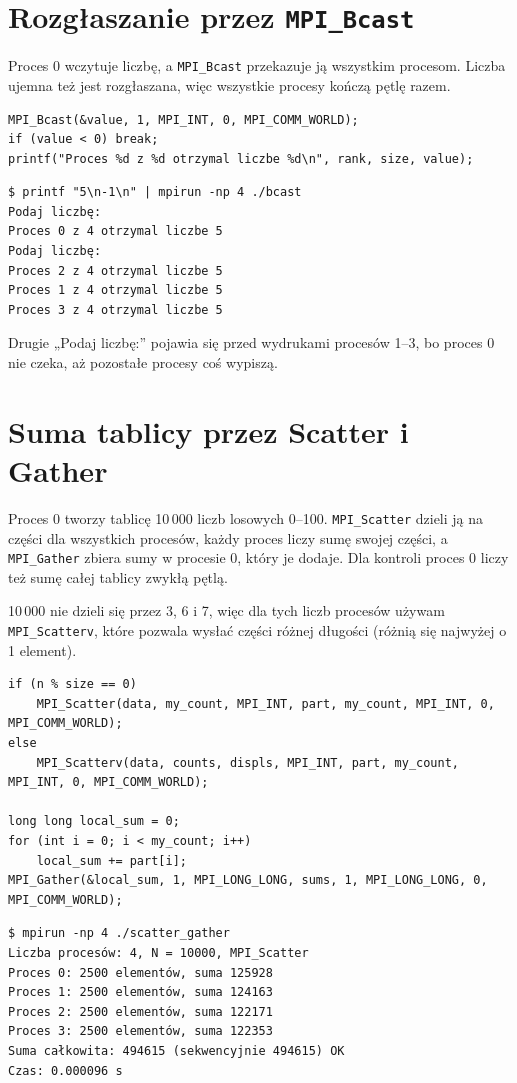 \documentclass[11pt,a4paper]{article}
\begin{document}
\section{Rozgłaszanie przez \texttt{MPI\_Bcast}}
Proces 0 wczytuje liczbę, a \texttt{MPI\_Bcast} przekazuje ją wszystkim procesom. Liczba ujemna też jest rozgłaszana, więc wszystkie procesy kończą pętlę razem.
\begin{lstlisting}
MPI_Bcast(&value, 1, MPI_INT, 0, MPI_COMM_WORLD);
if (value < 0) break;
printf("Proces %d z %d otrzymal liczbe %d\n", rank, size, value);
\end{lstlisting}
\begin{lstlisting}[style=plain]
$ printf "5\n-1\n" | mpirun -np 4 ./bcast
Podaj liczbę:
Proces 0 z 4 otrzymal liczbe 5
Podaj liczbę:
Proces 2 z 4 otrzymal liczbe 5
Proces 1 z 4 otrzymal liczbe 5
Proces 3 z 4 otrzymal liczbe 5
\end{lstlisting}
Drugie „Podaj liczbę:” pojawia się przed wydrukami procesów 1--3, bo proces 0 nie czeka, aż pozostałe procesy coś wypiszą.

\section{Suma tablicy przez Scatter i Gather}
Proces 0 tworzy tablicę 10\,000 liczb losowych 0--100. \texttt{MPI\_Scatter} dzieli ją na części dla wszystkich procesów, każdy proces liczy sumę swojej części, a \texttt{MPI\_Gather} zbiera sumy w procesie 0, który je dodaje. Dla kontroli proces 0 liczy też sumę całej tablicy zwykłą pętlą.

10\,000 nie dzieli się przez 3, 6 i 7, więc dla tych liczb procesów używam \texttt{MPI\_Scatterv}, które pozwala wysłać części różnej długości (różnią się najwyżej o 1 element).
\begin{lstlisting}
if (n % size == 0)
    MPI_Scatter(data, my_count, MPI_INT, part, my_count, MPI_INT, 0, MPI_COMM_WORLD);
else
    MPI_Scatterv(data, counts, displs, MPI_INT, part, my_count, MPI_INT, 0, MPI_COMM_WORLD);

long long local_sum = 0;
for (int i = 0; i < my_count; i++)
    local_sum += part[i];
MPI_Gather(&local_sum, 1, MPI_LONG_LONG, sums, 1, MPI_LONG_LONG, 0, MPI_COMM_WORLD);
\end{lstlisting}
\begin{lstlisting}[style=plain]
$ mpirun -np 4 ./scatter_gather
Liczba procesów: 4, N = 10000, MPI_Scatter
Proces 0: 2500 elementów, suma 125928
Proces 1: 2500 elementów, suma 124163
Proces 2: 2500 elementów, suma 122171
Proces 3: 2500 elementów, suma 122353
Suma całkowita: 494615 (sekwencyjnie 494615) OK
Czas: 0.000096 s
\end{lstlisting}
\end{document}
